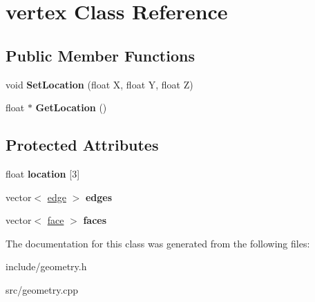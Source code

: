 \hypertarget{classvertex}{}\section{vertex Class Reference}
\label{classvertex}
\subsection*{Public Member Functions}
\begin{DoxyCompactItemize}
\item 
\mbox{\label{classvertex_a7e8dd0a559456491c21aa064ad3cd2b1}} 
void {\bfseries Set\+Location} (float X, float Y, float Z)
\item 
\mbox{\label{classvertex_ade2a767ce343020a8d6726c60c2160f6}} 
float $\ast$ {\bfseries Get\+Location} ()
\end{DoxyCompactItemize}
\subsection*{Protected Attributes}
\begin{DoxyCompactItemize}
\item 
\mbox{\label{classvertex_ad4810332aff1890615b6697db7e59698}} 
float {\bfseries location} \mbox{[}3\mbox{]}
\item 
\mbox{\label{classvertex_a72a7901acd4fea512c4bca235e1dbd88}} 
vector$<$ \hyperlink{classedge}{edge} $>$ {\bfseries edges}
\item 
\mbox{\label{classvertex_a1a3a5caa95f2b9dd09bac641af5f1f06}} 
vector$<$ \hyperlink{classface}{face} $>$ {\bfseries faces}
\end{DoxyCompactItemize}


The documentation for this class was generated from the following files\+:\begin{DoxyCompactItemize}
\item 
include/geometry.\+h\item 
src/geometry.\+cpp\end{DoxyCompactItemize}
